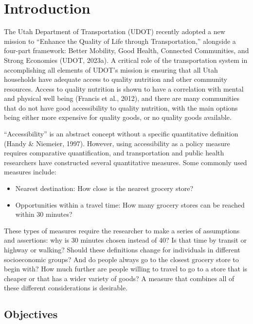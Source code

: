 \documentclass[
  letterpaper,
  authoryear,
  review,
  3p]{elsarticle}
\providecommand{\tightlist}{%
  \setlength{\itemsep}{0pt}\setlength{\parskip}{0pt}}\usepackage{longtable,booktabs,array}
\begin{document}

\hypertarget{introduction}{%
\section{Introduction}\label{introduction}}

The Utah Department of Transportation (UDOT) recently adopted a new
mission to ``Enhance the Quality of Life through Transportation,''
alongside a four-part framework: Better Mobility, Good Health, Connected
Communities, and Strong Economies (UDOT, 2023a). A critical role of the
transportation system in accomplishing all elements of UDOT's mission is
ensuring that all Utah households have adequate access to quality
nutrition and other community resources. Access to quality nutrition is
shown to have a correlation with mental and physical well being (Francis
et al., 2012), and there are many communities that do not have good
accessibility to quality nutrition, with the main options being either
more expensive for quality goods, or no quality goods available.

``Accessibility'' is an abstract concept without a specific quantitative
definition (Handy \& Niemeier, 1997). However, using accessibility as a
policy measure requires comparative quantification, and transportation
and public health researchers have constructed several quantitative
measures. Some commonly used measures include:

\begin{itemize}
\tightlist
\item
  Nearest destination: How close is the nearest grocery store?
\item
  Opportunities within a travel time: How many grocery stores can be
  reached within 30 minutes?
\end{itemize}

These types of measures require the researcher to make a series of
assumptions and assertions: why is 30 minutes chosen instead of 40? Is
that time by transit or highway or walking? Should these definitions
change for individuals in different socioeconomic groups? And do people
always go to the closest grocery store to begin with? How much further
are people willing to travel to go to a store that is cheaper or that
has a wider variety of goods? A measure that combines all of these
different considerations is desirable.

\hypertarget{objectives}{%
\subsection{Objectives}\label{objectives}}
\end{document}
